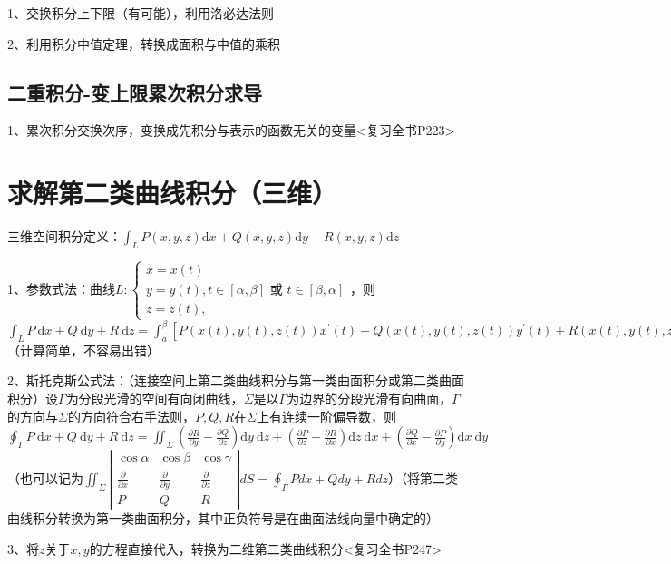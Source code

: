 1、交换积分上下限（有可能），利用洛必达法则

2、利用积分中值定理，转换成面积与中值的乘积



\subsection{二重积分-变上限累次积分求导}

1、累次积分交换次序，变换成先积分与表示的函数无关的变量<复习全书P223>

\section{求解第二类曲线积分（三维）}

三维空间积分定义：$\int_{L} P(x, y, z) \mathrm{d} x+Q(x, y, z) \mathrm{d} y+R(x, y, z) \mathrm{d} z$

1、参数式法：曲线$L:\left\{\begin{array}{l}x=x(t) \\ y=y(t), t \in[\alpha, \beta] \text { 或 } t \in[\beta, \alpha]\\ z=z(t),\end{array}\right.$，则$\int_{L} P \mathrm{~d} x+Q \mathrm{~d} y+R \mathrm{~d} z= \int_{a}^{\beta}\left[P(x(t), y(t), z(t)) x^{\prime}(t)+Q(x(t), y(t), z(t)) y^{\prime}(t)+R(x(t), y(t), z(t)) z^{\prime}(t)\right] \mathrm{d} t$（计算简单，不容易出错）

2、斯托克斯公式法：（连接空间上第二类曲线积分与第一类曲面积分或第二类曲面积分）设$\Gamma$为分段光滑的空间有向闭曲线，$\Sigma$是以$\Gamma$为边界的分段光滑有向曲面，$\Gamma$的方向与$\Sigma$的方向符合右手法则，$P, Q, R$在$\Sigma$上有连续一阶偏导数，则$\oint_{\Gamma} P \mathrm{~d} x+Q \mathrm{~d} y+R \mathrm{~d} z=\iint_{\Sigma}\left(\frac{\partial R}{\partial y}-\frac{\partial Q}{\partial z}\right) \mathrm{d} y \mathrm{~d} z+\left(\frac{\partial P}{\partial z}-\frac{\partial R}{\partial x}\right) \mathrm{d} z \mathrm{~d} x+\left(\frac{\partial Q}{\partial x}-\frac{\partial P}{\partial y}\right) \mathrm{d} x \mathrm{~d} y$（也可以记为$\iint_{\Sigma}\left|\begin{array}{ccc}\cos \alpha & \cos \beta & \cos \gamma \\\frac{\partial}{\partial x} & \frac{\partial}{\partial y} & \frac{\partial}{\partial z} \\P & Q & R\end{array}\right| d S=\oint_{\Gamma} P d x+Q d y+R d z$）（将第二类曲线积分转换为第一类曲面积分，其中正负符号是在曲面法线向量中确定的）

3、将$z$关于$x,y$的方程直接代入，转换为二维第二类曲线积分<复习全书P247>

